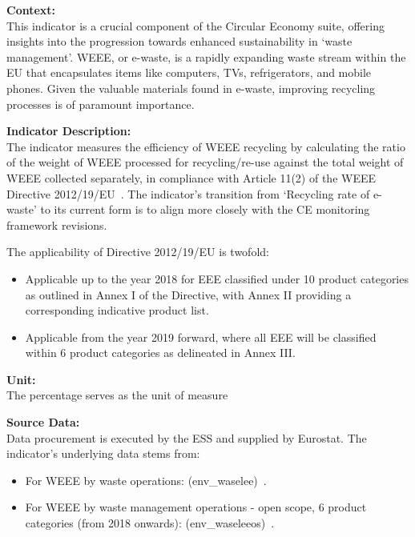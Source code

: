 {\large\textbf{Context:}}  \\ \indent
This indicator is a crucial component of the Circular Economy suite, offering insights into the progression towards enhanced sustainability in `waste management'. WEEE, or e-waste, is a rapidly expanding waste stream within the EU that encapsulates items like computers, TVs, refrigerators, and mobile phones. Given the valuable materials found in e-waste, improving recycling processes is of paramount importance.

{\large\textbf{Indicator Description:}}  \\ \indent
The indicator measures the efficiency of WEEE recycling by calculating the ratio of the weight of WEEE processed for recycling/re-use against the total weight of WEEE collected separately, in compliance with Article 11(2) of the WEEE Directive 2012/19/EU~\cite{eu2012weee, eu2012weeerecast}. The indicator's transition from `Recycling rate of e-waste' to its current form is to align more closely with the CE monitoring framework revisions.

The applicability of Directive 2012/19/EU is twofold:
\begin{itemize}
  \item Applicable up to the year 2018 for EEE classified under 10 product categories
        as outlined in Annex I of the Directive, with Annex II providing a
        corresponding indicative product list.
  \item Applicable from the year 2019 forward, where all EEE will be classified within
        6 product categories as delineated in Annex III.
\end{itemize}

{\large\textbf{Unit:}}  \\ \indent
The percentage serves as the unit of measure

{\large\textbf{Source Data:}}  \\ \indent \indent
Data procurement is executed by the ESS and supplied by Eurostat. The indicator's underlying data stems from:
\begin{itemize}
  \item For WEEE by waste operations:
        (env\_waselee)~\href{http://ec.europa.eu/eurostat/web/products-datasets/-/env_waselee}{\faExternalLink}.
  \item For WEEE by waste management operations - open scope, 6 product categories
        (from 2018 onwards):
        (env\_waseleeos)~\href{https://ec.europa.eu/eurostat/web/products-datasets/-/env_waseleeos}{\faExternalLink}.
\end{itemize}


\sectionEndlines
\clearpage
